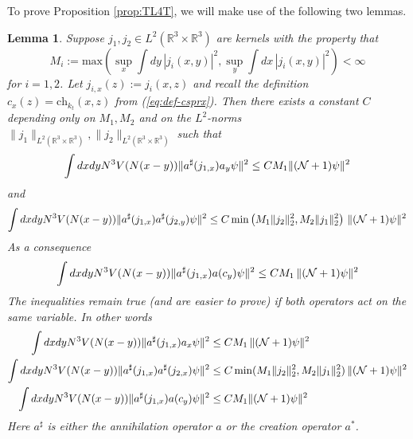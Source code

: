 \documentclass[11pt,a4paper,DIV11]{scrartcl}	%
\newtheorem{lemma}[thm]{Lemma}
\newcommand{\bR}{{\mathbb R}}
\newcommand{\cN}{{\cal N}}
\begin{document}
To prove Proposition \ref{prop:TL4T}, we will make use of the following two lemmas.
\begin{lemma}\label{lm:4}
Suppose $j_1, j_2 \in L^2 (\bR^3 \times \bR^3)$ are kernels with the property that 
\[ M_i  := \text{max} \left( \sup_x \int dy \, |j_i (x,y)|^2 , \sup_y \int dx \, |j_i (x,y)|^2 \right) < \infty \]
for $i =1 ,2$. Let $j_{i,x} (z) := j_i (x,z)$ and recall the definition $c_x (z) = \text{ch}_{k_t} (x,z)$ from (\ref{eq:def-csprx}). Then there exists a constant $C$ depending only on $M_1, M_2$ and on the $L^2$-norms $\| j_1 \|_{L^2 (\bR^3 \times \bR^3)} , \| j_2 \|_{L^2 (\bR^3 \times \bR^3)}$ such that
\begin{equation}\label{eq:lm4-1}
\int dx dy N^3 V (N (x-y)) \| a^\sharp (j_{1,x}) a_y \psi \|^2 \leq C M_1 \| (\cN+1) \psi \|^2
\end{equation}
and 
\begin{equation}\label{eq:lm4-2}
\int dx dy N^3 V(N (x-y)) \| a^\sharp (j_{1,x}) a^\sharp (j_{2,y}) \psi \|^2 \leq C \min \left(M_1 \| j_2 \|^2_2 , M_2 \| j_1 \|_2^2 \right) \, \| (\cN+1) \psi \|^2 
\end{equation}
As a consequence
\begin{equation}\label{eq:lm4-3}
\int dx dy N^3 V (N (x-y)) \| a^\sharp (j_{1,x}) a (c_y) \psi \|^2 \leq C M_1 \, \| (\cN+1) \psi \|^2 \end{equation}
The inequalities remain true (and are easier to prove) if both operators act on the same variable. In other words
\begin{equation}\label{eq:lm4-4}
\begin{split}
\int dx dy N^3 V (N (x-y)) \| a^\sharp (j_{1,x}) a_x \psi \|^2 &\leq C M_1 \, \| (\cN+1) \psi \|^2 \\
\int dx dy N^3 V(N (x-y)) \| a^\sharp (j_{1,x}) a^\sharp (j_{2,x}) \psi \|^2 &\leq C \min (M_1 \|j_2 \|_2^2 , M_2 \|j_1\|_2^2 ) \, \| (\cN+1) \psi \|^2 \\
\int dx dy N^3 V (N (x-y)) \| a^\sharp (j_{1,x}) a (c_y) \psi \|^2 &\leq C M_1  \| (\cN+1) \psi \|^2
\end{split}
\end{equation}
Here $a^\sharp$ is either the annihilation operator $a$ or the creation operator $a^*$. 
\end{lemma}
\end{document}
